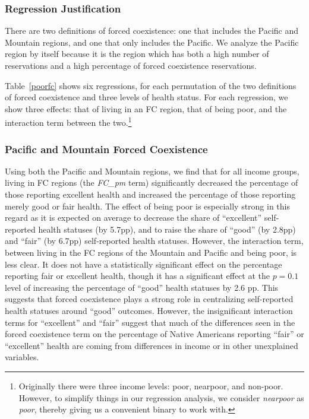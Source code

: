 \documentclass[12pt]{article}
\begin{document}
\subsubsection{Regression Justification}
There are two definitions of forced coexistence: one that includes the Pacific and Mountain regions, and one that only includes the Pacific.
We analyze the Pacific region by itself because it is the region which has both a high number of reservations and a high percentage of forced coexistence reservations.


Table~\ref{poorfc} shows six regressions, for each permutation of the two definitions of forced coexistence and three levels of health status.
For each regression, we show three effects: that of living in an FC region, that of being poor, and the interaction term between the two.\footnote{Originally there were three income levels: poor, nearpoor, and non-poor. However, to simplify things in our regression analysis, we consider \emph{nearpoor} as \emph{poor}, thereby giving us a convenient binary to work with.}

\subsubsection{Pacific and Mountain Forced Coexistence}
Using both the Pacific and Mountain regions, we find that for all income groups, living in FC regions (the \emph{FC\_pm} term) significantly decreased the percentage of those reporting excellent health and increased the percentage of those reporting merely good or fair health. 
The effect of being poor is especially strong in this regard as it is expected on average to decrease the share of ``excellent'' self-reported health statuses (by 5.7pp), and to raise the share of ``good'' (by 2.8pp) and ``fair'' (by 6.7pp) self-reported health statuses.
However, the interaction term, between living in the FC regions of the Mountain and Pacific and being poor, is less clear.
It does not have a statistically significant effect on the percentage reporting fair or excellent health, though it has a significant effect at the $p=0.1$ level of increasing the percentage of ``good'' health statuses by 2.6 pp.
This suggests that forced coexistence plays a strong role in centralizing self-reported health statuses around ``good'' outcomes. 
However, the insignificant interaction terms for ``excellent'' and ``fair'' suggest that much of the differences seen in the forced coexistence term on the percentage of Native Americans reporting ``fair'' or ``excellent'' health are coming from differences in income or in other unexplained variables.  
\end{document}
